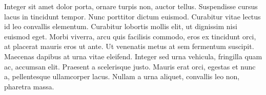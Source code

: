 \documentclass[runningheads,a4paper]{llncs}
\begin{document}
Integer sit amet dolor porta, ornare turpis non, auctor tellus. Suspendisse cursus lacus in tincidunt tempor. Nunc porttitor dictum euismod. Curabitur vitae lectus id leo convallis elementum. Curabitur lobortis mollis elit, ut dignissim nisi euismod eget. Morbi viverra, arcu quis facilisis commodo, eros ex tincidunt orci, at placerat mauris eros ut ante. Ut venenatis metus at sem fermentum suscipit. Maecenas dapibus at urna vitae eleifend. Integer sed urna vehicula, fringilla quam ac, accumsan elit. Praesent a scelerisque justo. Mauris erat orci, egestas et nunc a, pellentesque ullamcorper lacus. Nullam a urna aliquet, convallis leo non, pharetra massa. 




\end{document}

